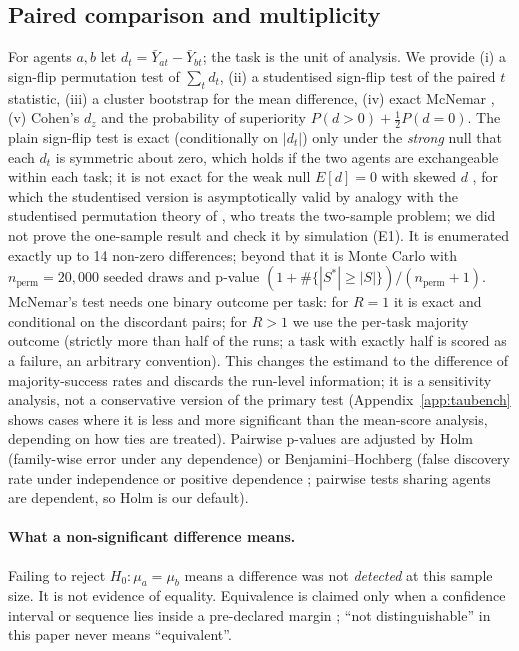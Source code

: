 \subsection{Paired comparison and multiplicity}
For agents $a,b$ let $d_t=\bar Y_{at}-\bar Y_{bt}$; the task is the unit of analysis. We provide (i) a sign-flip permutation test of $\sum_t d_t$, (ii) a studentised sign-flip test of the paired $t$ statistic, (iii) a cluster bootstrap for the mean difference, (iv) exact McNemar \citep{mcnemar1947}, (v) Cohen's $d_z$ and the probability of superiority $P(d>0)+\tfrac12P(d=0)$. The plain sign-flip test is exact (conditionally on $|d_t|$) only under the \emph{strong} null that each $d_t$ is symmetric about zero, which holds if the two agents are exchangeable within each task; it is not exact for the weak null $E[d]=0$ with skewed $d$ \citep{romano1990randomization}, for which the studentised version is asymptotically valid by analogy with the studentised permutation theory of \citet{janssen1997studentized}, who treats the two-sample problem; we did not prove the one-sample result and check it by simulation (E1). It is enumerated exactly up to 14 non-zero differences; beyond that it is Monte Carlo with $n_\text{perm}=20{,}000$ seeded draws and p-value $(1+\#\{|S^*|\ge|S|\})/(n_\text{perm}+1)$. McNemar's test needs one binary outcome per task: for $R=1$ it is exact and conditional on the discordant pairs; for $R>1$ we use the per-task majority outcome (strictly more than half of the runs; a task with exactly half is scored as a failure, an arbitrary convention). This changes the estimand to the difference of majority-success rates and discards the run-level information; it is a sensitivity analysis, not a conservative version of the primary test (Appendix~\ref{app:taubench} shows cases where it is less and more significant than the mean-score analysis, depending on how ties are treated). Pairwise p-values are adjusted by Holm \citep{holm1979} (family-wise error under any dependence) or Benjamini--Hochberg \citep{benjamini1995} (false discovery rate under independence or positive dependence \citep{benjamini2001dependency}; pairwise tests sharing agents are dependent, so Holm is our default).

\paragraph{What a non-significant difference means.} Failing to reject $H_0:\mu_a=\mu_b$ means a difference was not \emph{detected} at this sample size. It is not evidence of equality. Equivalence is claimed only when a confidence interval or sequence lies inside a pre-declared margin \citep{lakens2017equivalence}; ``not distinguishable'' in this paper never means ``equivalent''.

